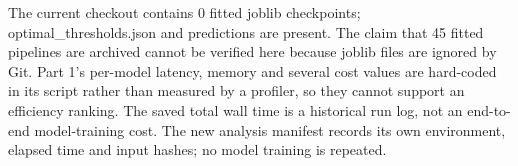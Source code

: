The current checkout contains 0 fitted joblib checkpoints; optimal\_thresholds.json and predictions are present. The claim that 45 fitted pipelines are archived cannot be verified here because joblib files are ignored by Git. Part 1's per-model latency, memory and several cost values are hard-coded in its script rather than measured by a profiler, so they cannot support an efficiency ranking. The saved total wall time is a historical run log, not an end-to-end model-training cost. The new analysis manifest records its own environment, elapsed time and input hashes; no model training is repeated.

